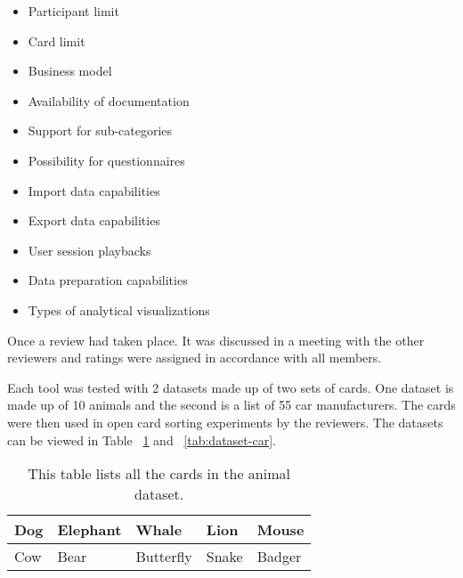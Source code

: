 \begin{itemize}
    \item Participant limit
    \item Card limit
    \item Business model
    \item Availability of documentation
    \item Support for sub-categories
    \item Possibility for questionnaires
    \item Import data capabilities
    \item Export data capabilities
    \item User session playbacks
    \item Data preparation capabilities
    \item Types of analytical visualizations
\end{itemize}

Once a review had taken place. It was discussed
in a meeting with the other reviewers and ratings were assigned in
accordance with all members.

Each tool was tested with 2 datasets made up of two sets of cards. One
dataset is made up of 10 animals and the second is a list of 55 car
manufacturers. The cards were then used in open card sorting
experiments by the reviewers. The datasets can be viewed in Table
~\ref{tab:dataset-animal} and ~\ref{tab:dataset-car}.

\begin{table}[bp]
\centering
\begin{tabularx}
{\linewidth}{|X|X|X|X|X|}
\hline
Dog& Elephant  & Whale     & Lion& Mouse         \\
\hline
Cow       & Bear& Butterfly & Snake  & Badger    \\
\hline
\end{tabularx} 
\caption[Animal Dataset] 
{ 
This table lists all the cards in the animal dataset.
}
\label{tab:dataset-animal}
\end{table}

